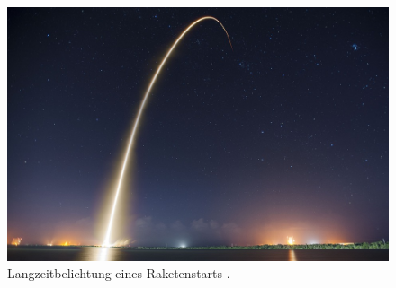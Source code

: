 \begin{figure}
	\centering
	\includegraphics[width=\textwidth]{papers/leo/Grafiken/rocket-launch}
	\caption{Langzeitbelichtung eines Raketenstarts \cite{leo:spacex_trajectory_2015}.}
	\label{fig:rocket-launch}
\end{figure}


